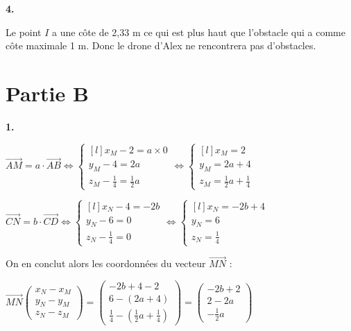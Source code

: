 \documentclass{article}
\begin{document}
\vspace{6mm}

\textbf{4.}

\vspace{2mm}

\noindent Le point $I$ a une côte de 2,33 m ce qui est plus haut que l'obstacle qui a comme côte maximale 1 m. Donc le drone d'Alex ne rencontrera pas d'obstacles.

\section{Partie B}

\textbf{1.}

\vspace{2mm}

$\overrightarrow{AM} = a \cdot \overrightarrow{AB}
\Leftrightarrow \left\{\begin{matrix*}[l]
   x_M - 2 = a \times 0\\
   y_M - 4 = 2a\\
   z_M - \frac{1}{4} = \frac{1}{2}a
\end{matrix*}\right.
\Leftrightarrow \left\{\begin{matrix*}[l]
   x_M = 2\\
   y_M = 2a + 4\\
   z_M = \frac{1}{2} a + \frac{1}{4}
\end{matrix*}\right.$


\vspace{2mm}


$\overrightarrow{CN} = b \cdot \overrightarrow{CD}
\Leftrightarrow \left\{\begin{matrix*}[l]
   x_N - 4 = -2b\\
   y_N - 6 = 0\\
   z_N - \frac{1}{4} = 0
\end{matrix*}\right.
\Leftrightarrow \left\{\begin{matrix*}[l]
   x_N = -2b + 4\\
   y_N = 6\\
   z_N = \frac{1}{4}
\end{matrix*}\right.$

\vspace{2mm}

\noindent On en conclut alors les coordonnées du vecteur $\overrightarrow{MN}$ :

\vspace{3mm}

$\overrightarrow{MN}\begin{pmatrix}
   x_N - x_M\\
   y_N - y_M\\
   z_N - z_M
\end{pmatrix}
= 
\begin{pmatrix}
   -2b + 4 - 2\\
   6 - (2a+4)\\
   \frac{1}{4} - (\frac{1}{2}a + \frac{1}{4})
\end{pmatrix}
=
\begin{pmatrix}
   -2b + 2\\
   2 - 2a\\
   -\frac{1}{2}a
\end{pmatrix}
$
\end{document}
